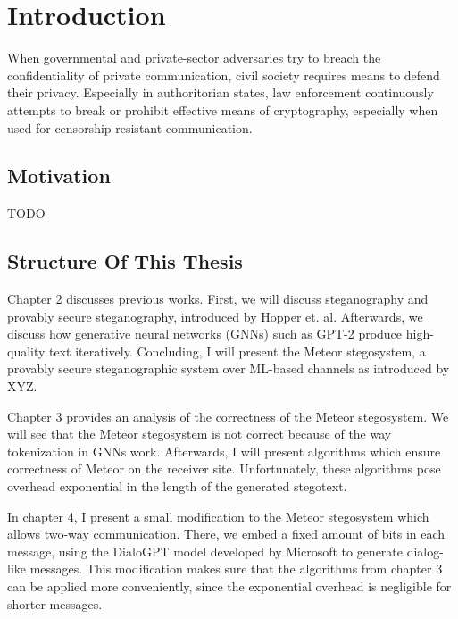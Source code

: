 \documentclass[english,version-2020-11]{uzl-thesis}
\begin{document}
%
%



%

\chapter{Introduction}

When governmental and private-sector adversaries try to breach the confidentiality of private communication, civil society requires means to defend their privacy.
Especially in authoritorian states, law enforcement continuously attempts to break or prohibit effective means of cryptography, especially when used for censorship-resistant communication.

\section{Motivation}

TODO

\section{Structure Of This Thesis}

Chapter 2 discusses previous works.
First, we will discuss steganography and provably secure steganography, introduced by Hopper et. al. 
Afterwards, we discuss how generative neural networks (GNNs) such as GPT-2 produce high-quality text iteratively.
Concluding, I will present the Meteor stegosystem, a provably secure steganographic system over ML-based channels as introduced by XYZ.

Chapter 3 provides an analysis of the correctness of the Meteor stegosystem. 
We will see that the Meteor stegosystem is not correct because of the way tokenization in GNNs work.
Afterwards, I will present algorithms which ensure correctness of Meteor on the receiver site.
Unfortunately, these algorithms pose overhead exponential in the length of the generated stegotext.

In chapter 4, I present a small modification to the Meteor stegosystem which allows two-way communication.
There, we embed a fixed amount of bits in each message, using the DialoGPT model developed by Microsoft  to generate dialog-like messages.
This modification makes sure that the algorithms from chapter 3 can be applied more conveniently, since the exponential overhead is negligible for shorter messages.
\end{document}
